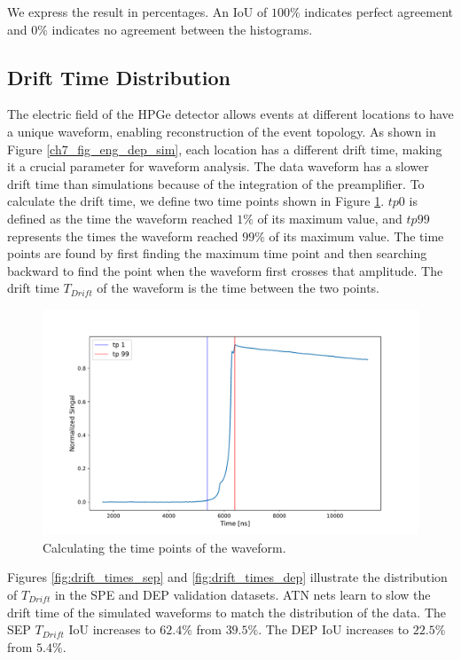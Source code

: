 We express the result in percentages. An IoU of $100\%$ indicates perfect agreement and $0\%$ indicates no agreement between the histograms.
 
\subsection{Drift Time Distribution}

The electric field of the HPGe detector allows events at different locations to have a unique waveform, enabling reconstruction of the event topology. As shown in Figure \ref{ch7_fig_eng_dep_sim}, each location has a different drift time, making it a crucial parameter for waveform analysis. The data waveform has a slower drift time than simulations because of the integration of the preamplifier. To calculate the drift time, we define two time points shown in Figure \ref{fig_ch8_time_calc}. $tp0$ is defined as the time the waveform reached $1\%$ of its maximum value, and $tp 99$ represents the times the waveform reached $99\%$ of its maximum value. The time points are found by first finding the maximum time point and then searching backward to find the point when the waveform first crosses that amplitude. The drift time $T_{Drift}$ of the waveform is the time between the two points. 

\begin{figure}%
    \centering
    \includegraphics[width=0.9\linewidth]{ch8/figs/time_calc.pdf}
    \caption{Calculating the time points of the waveform.}
    \label{fig_ch8_time_calc}
\end{figure}


 Figures \ref{fig:drift_times_sep} and \ref{fig:drift_times_dep} illustrate the distribution of $T_{Drift}$ in the SPE and DEP validation datasets. ATN nets learn to slow the drift time of the simulated waveforms to match the distribution of the data.  The SEP $T_{Drift}$ IoU increases to $62.4\%$ from $39.5\%$. The DEP IoU increases to $22.5\%$ from $5.4\%$.
 
